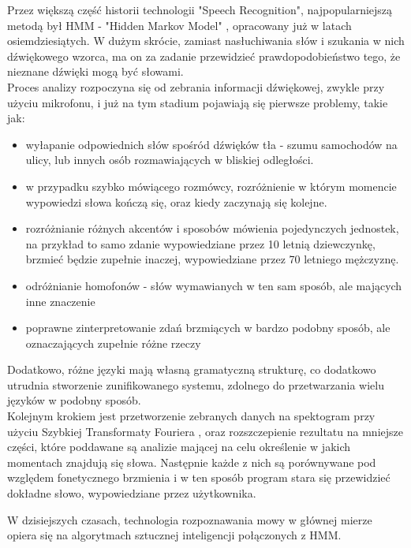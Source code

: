\documentclass[12pt, a4paper]{article}
\begin{document}
\begin{sloppypar}
{{    Przez większą część historii technologii "Speech Recognition", 
    najpopularniejszą metodą był HMM - "Hidden Markov Model" \cite{markov_article},
    opracowany już w latach osiemdziesiątych. W dużym skrócie, zamiast nasłuchiwania 
    słów i szukania w nich dźwiękowego wzorca, ma on za zadanie przewidzieć
    prawdopodobieństwo tego, że nieznane dźwięki mogą być słowami.\\   
    Proces analizy rozpoczyna się od zebrania informacji dźwiękowej,
    zwykle przy użyciu mikrofonu, i już na tym stadium pojawiają się pierwsze 
    problemy, takie jak:
    \begin{itemize}
      \item wyłapanie odpowiednich słów spośród dźwięków tła - szumu samochodów na 
      ulicy, lub innych osób rozmawiających w bliskiej odległości.
      \item w przypadku szybko mówiącego rozmówcy, rozróżnienie w którym momencie
      wypowiedzi słowa kończą się, oraz kiedy zaczynają się kolejne.
      \item rozróżnianie różnych akcentów i sposobów mówienia pojedynczych jednostek,
      na przykład to samo zdanie wypowiedziane przez 10 letnią dziewczynkę, brzmieć
      będzie zupełnie inaczej, wypowiedziane przez 70 letniego mężczyznę. 
      \item odróżnianie homofonów - słów wymawianych w ten sam sposób, ale mających
      inne znaczenie
      \item poprawne zinterpretowanie zdań brzmiących w bardzo podobny sposób, ale
      oznaczających zupełnie różne rzeczy
    \end{itemize} 
    Dodatkowo, różne języki mają własną gramatyczną strukturę, co dodatkowo utrudnia
    stworzenie zunifikowanego systemu, zdolnego do przetwarzania wielu języków w 
    podobny sposób.\\
    Kolejnym krokiem jest przetworzenie zebranych danych na spektogram przy użyciu
    Szybkiej Transformaty Fouriera \cite{fourier}, oraz rozszczepienie
    rezultatu na mniejsze części, które poddawane są analizie mającej na celu
    określenie w jakich momentach znajdują się słowa. Następnie każde z nich są
    porównywane pod względem fonetycznego brzmienia i w ten sposób program stara
    się przewidzieć dokładne słowo, wypowiedziane przez użytkownika.

    W dzisiejszych czasach, technologia rozpoznawania mowy w głównej mierze opiera
    się na algorytmach sztucznej inteligencji połączonych z HMM.
  }
}
\end{sloppypar}
\end{document}
